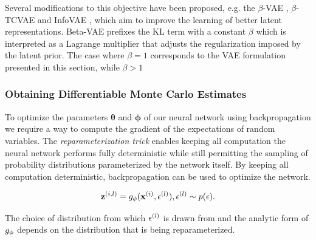 Several modifications to this objective have been proposed, e.g. the $\beta$-VAE \cite{beta_vae, understanding_beta_vae}, $\beta$-TCVAE \cite{beta_tcvae} and InfoVAE \cite{infovae}, which aim to improve the learning of better latent representations. Beta-VAE prefixes the KL term with a constant $\beta$ which is interpreted as a Lagrange multiplier that adjusts the regularization imposed by the latent prior. The case where $\beta = 1$ corresponds to the VAE formulation presented in this section, while $\beta > 1$ 

\subsubsection{Obtaining Differentiable Monte Carlo Estimates}

To optimize the parameters $\mathbf{\theta}$ and $\mathbf{\phi}$ of our neural network using backpropagation we require a way to compute the gradient of the expectations of random variables. The \textit{reparameterization trick} enables keeping all computation the neural network performs fully deterministic while still permitting the sampling of probability distributions parameterized by the network itself. By keeping all computation deterministic, backpropagation can be used to optimize the network.


$$\mathbf{z}^{(i,l)} = g_{\mathbf{\phi}}(\mathbf{x}^{(i)}, \mathbf{\epsilon}^{(l)}), \mathbf{\epsilon}^{(l)} \sim p(\mathbf{\epsilon}).$$

The choice of distribution from which $\mathbf{\epsilon}^{(l)}$ is drawn from and the analytic form of $g_{\mathbf{\phi}}$ depends on the distribution that is being reparameterized. 

